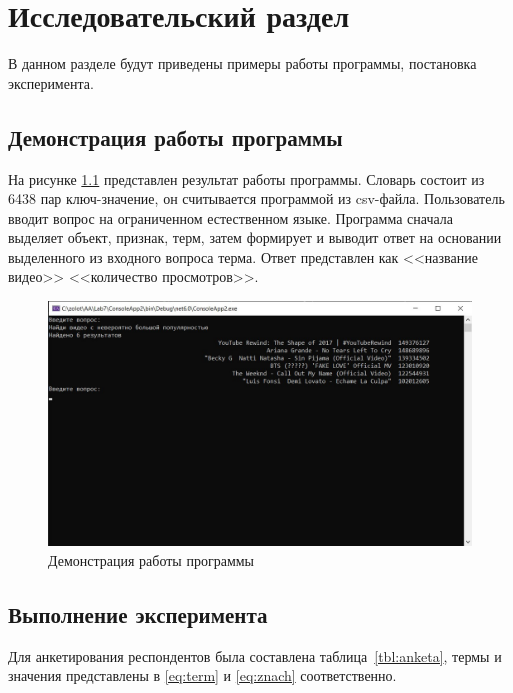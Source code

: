 \chapter{Исследовательский раздел}

В данном разделе будут приведены примеры работы программы, постановка эксперимента.

\section{Демонстрация работы программы}

На рисунке \ref{fig:democonsole} представлен результат работы программы. Словарь состоит из 6438 пар ключ-значение, он считывается программой из csv-файла. Пользователь вводит вопрос на ограниченном естественном языке. Программа сначала выделяет объект, признак, терм, затем формирует и выводит ответ на основании выделенного из входного вопроса терма. Ответ представлен как <<название видео>> <<количество просмотров>>.


\captionsetup{justification=centering, singlelinecheck=false}
\begin{figure}[H]
	\centering
	\includegraphics[width=1\linewidth]{inc/img/democonsole}
	\caption{Демонстрация работы программы}
	\label{fig:democonsole}
\end{figure}

\section{Выполнение эксперимента}

Для анкетирования респондентов была составлена таблица~\ref{tbl:anketa}, термы и значения представлены в \eqref{eq:term} и \eqref{eq:znach} соответственно.

